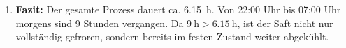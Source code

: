 \documentclass[ngerman]{scrreprt}
\newenvironment{loesungbox}[1]
  {\needspace{5\baselineskip}\begin{loesungboxstyle}[frametitle={#1}]}
  {\end{loesungboxstyle}}
\begin{document}
\begin{loesungbox}{Lösung zu \Cref{aufg:saft_tk}}
\begin{enumerate}
\begin{equation}
        Q_{\text{ges}} = Q_{1} + Q_{2} = \SI{1374.45}{\kilo\joule} + \SI{1283.98}{\kilo\joule} = \SI{2658.43}{\kilo\joule}\mDot
    \end{equation}
    Die benötigte Zeit dafür ergibt sich aus der Leistung $P = E/t$:
    \begin{equation}\label{eq: saft_zeit}
        t = \frac{Q_{\text{ges}}}{P} = \frac{\SI{2658430}{\joule}}{\SI{120}{\watt}} = \SI{22153.5}{\second} \approx \SI{6.15}{\hour} \mDot
    \end{equation}
    \item \textbf{Fazit:} Der gesamte Prozess dauert ca. \SI{6.15}{\hour}. Von 22:00 Uhr bis 07:00 Uhr morgens sind 9 Stunden vergangen. Da $\SI{9}{\hour} > \SI{6.15}{\hour}$, ist der Saft nicht nur vollständig gefroren, sondern bereits im festen Zustand weiter abgekühlt.
\end{enumerate}
\end{loesungbox}
\end{document}
